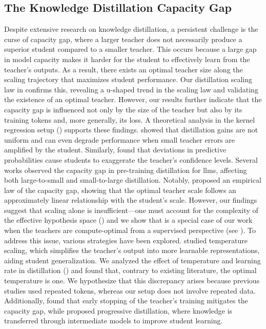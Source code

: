 \subsection{The Knowledge Distillation Capacity Gap}
\label{ssec:the-capacity-gap}
Despite extensive research on knowledge distillation, a persistent challenge is the curse of capacity gap, where a larger teacher does not necessarily produce a superior student compared to a smaller teacher.
This occurs because a large gap in model capacity makes it harder for the student to effectively learn from the teacher's outputs. As a result, there exists an optimal teacher size along the scaling trajectory that maximizes student performance. Our distillation scaling law in  confirms this, revealing a u-shaped trend in the scaling law and validating the existence of an optimal teacher. However, our results further indicate that the capacity gap is influenced not only by the size of the teacher but also by its training tokens and, more generally, its loss. A theoretical analysis in the kernel regression setup () supports these findings.
\citet{DBLP:journals/tmlr/LukasikBMK22} showed that distillation gains are not uniform and can even degrade performance when small teacher errors are amplified by the student. Similarly, \citet{DBLP:conf/nips/NagarajanMBMK23} found that deviations in predictive probabilities cause students to exaggerate the teacher's confidence levels. Several works \citep{DBLP:journals/corr/abs-2410-16215,DBLP:journals/corr/abs-2311-07052,DBLP:journals/corr/abs-2410-18779} observed the capacity gap in pre-training distillation for \gls{llm}s, affecting both large-to-small and small-to-large distillation. 
Notably, \citet{DBLP:journals/corr/abs-2311-07052} proposed an empirical law of the capacity gap, showing that the optimal teacher scale follows an approximately linear relationship with the student's scale. 
However, our findings suggest that scaling alone is insufficient—one must account for the complexity of the effective hypothesis space ()
and we show that \citet{DBLP:journals/corr/abs-2311-07052}
is a special case of our work when the teachers are compute-optimal from a supervised perspective (see ).
To address this issue, various strategies have been explored. \citet{DBLP:journals/kbs/YuanLQ24} studied temperature scaling, which simplifies the teacher's output into more learnable representations, aiding student generalization. We analyzed the effect of temperature and learning rate in distillation () and found that, contrary to existing literature, the optimal temperature is one. We hypothesize that this discrepancy arises because previous studies used repeated tokens, whereas our setup does not involve repeated data. Additionally, \citet{DBLP:conf/iccv/ChoH19} found that early stopping of the teacher's training mitigates the capacity gap, while \citet{DBLP:conf/aaai/MirzadehFLLMG20} proposed progressive distillation, where knowledge is transferred through intermediate models to improve student learning.
